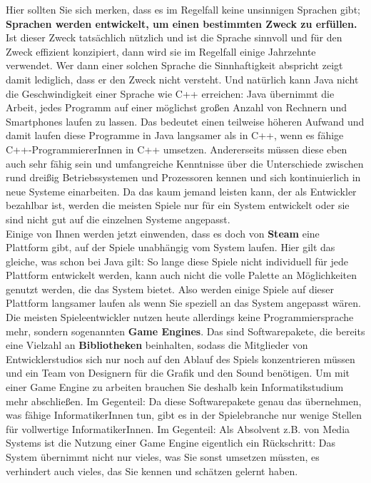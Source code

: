 Hier sollten Sie sich merken, dass es im Regelfall keine unsinnigen Sprachen gibt; \textbf{Sprachen werden entwickelt, um einen bestimmten Zweck zu erfüllen.} Ist dieser Zweck tatsächlich nützlich und ist die Sprache sinnvoll und für den Zweck effizient konzipiert, dann wird sie im Regelfall einige Jahrzehnte verwendet. Wer dann einer solchen Sprache die Sinnhaftigkeit abspricht zeigt damit lediglich, dass er den Zweck nicht versteht. Und natürlich kann Java nicht die Geschwindigkeit einer Sprache wie C++ erreichen: Java übernimmt die Arbeit, jedes Programm auf einer möglichst großen Anzahl von Rechnern und Smartphones laufen zu lassen. Das bedeutet einen teilweise höheren Aufwand und damit laufen diese Programme in Java langsamer als in C++, wenn es fähige C++-ProgrammiererInnen in C++ umsetzen. Andererseits müssen diese eben auch sehr fähig sein und umfangreiche Kenntnisse über die Unterschiede zwischen rund dreißig Betriebssystemen und Prozessoren kennen und sich kontinuierlich in neue Systeme einarbeiten. Da das kaum jemand leisten kann, der als Entwickler bezahlbar ist, werden die meisten Spiele nur für ein System entwickelt oder sie sind nicht gut auf die einzelnen Systeme angepasst.\\

Einige von Ihnen werden jetzt einwenden, dass es doch von \textbf{Steam} eine Plattform gibt, auf der Spiele unabhängig vom System laufen. Hier gilt das gleiche, was schon bei Java gilt: So lange diese Spiele nicht individuell für jede Plattform entwickelt werden, kann auch nicht die volle Palette an Möglichkeiten genutzt werden, die das System bietet. Also werden einige Spiele auf dieser Plattform langsamer laufen als wenn Sie speziell an das System angepasst wären.\\

Die meisten Spieleentwickler nutzen heute allerdings keine Programmiersprache mehr, sondern sogenannten \textbf{Game Engines}. Das sind Softwarepakete, die bereits eine Vielzahl an \textbf{Bibliotheken} beinhalten, sodass die Mitglieder von Entwicklerstudios sich nur noch auf den Ablauf des Spiels konzentrieren müssen und ein Team von Designern für die Grafik und den Sound benötigen. Um mit einer Game Engine zu arbeiten brauchen Sie deshalb kein Informatikstudium mehr abschließen. Im Gegenteil: Da diese Softwarepakete genau das übernehmen, was fähige InformatikerInnen tun, gibt es in der Spielebranche nur wenige Stellen für vollwertige InformatikerInnen. Im Gegenteil: Als Absolvent z.B. von Media Systems ist die Nutzung einer Game Engine eigentlich ein Rückschritt: Das System übernimmt nicht nur vieles, was Sie sonst umsetzen müssten, es verhindert auch vieles, das Sie kennen und schätzen gelernt haben.\\

